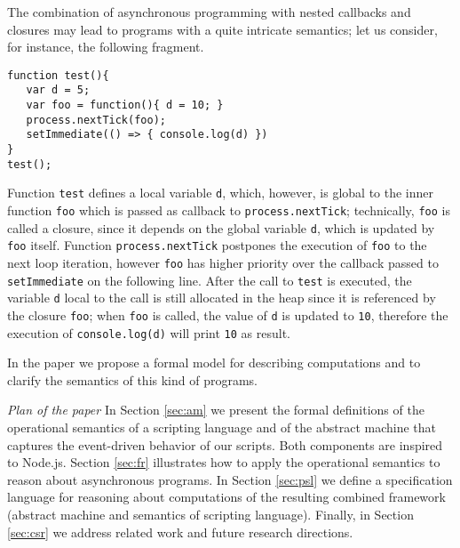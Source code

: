 The combination of asynchronous programming with nested callbacks and closures
may lead to programs with a quite intricate semantics; let us consider, for instance, the following fragment.
\begin{verbatim}
function test(){
   var d = 5;
   var foo = function(){ d = 10; }
   process.nextTick(foo);
   setImmediate(() => { console.log(d) })
}
test(); 
\end{verbatim}
Function \verb+test+ defines a local variable \verb+d+, which, however, is global to  
the inner function \verb+foo+ which is passed as callback to \verb+process.nextTick+;
technically,  \verb+foo+ is called a closure, since it depends on the global variable 
\verb+d+, which is updated by \verb+foo+ itself. Function \verb+process.nextTick+ postpones the execution of \verb+foo+ to the next loop iteration, however \verb+foo+
has higher priority over the callback passed to \verb+setImmediate+ on the following line.
After the call to \verb+test+ is executed, the variable \verb+d+ local to the call is still allocated in the heap since it is referenced by the
closure \verb+foo+; when \verb+foo+ is called, the value of \verb+d+ is updated to \verb+10+,  therefore the execution of \verb+console.log(d)+ 
will print \verb+10+ as result.

In the paper we  propose a formal model for describing computations and to clarify the semantics of this kind of programs.

{\em Plan of the paper}
In Section \ref{sec:am} we present the formal definitions of the operational semantics of a scripting language and of the abstract machine that captures the event-driven behavior of our scripts. Both components are inspired to Node.js. 
Section \ref{sec:fr} illustrates how to apply the operational semantics to reason about asynchronous programs. In Section \ref{sec:psl} we define a specification language for reasoning about computations of the resulting combined framework (abstract machine and semantics of scripting language).
Finally, in Section \ref{sec:csr} we address related work and future research directions.

 








